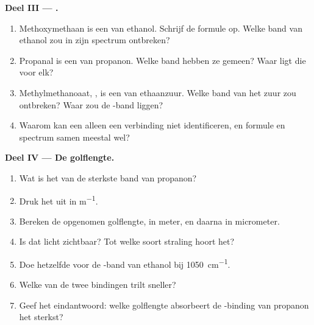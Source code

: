 \begin{problem}
\medskip
\noindent\textbf{Deel III --- .}
\begin{enumerate}[resume]
  \item Methoxymethaan is een  van ethanol. Schrijf de formule op.
        Welke band van ethanol zou in zijn spectrum ontbreken?
  \item Propanal is een  van propanon. Welke band hebben ze gemeen?
        Waar ligt die voor elk?
  \item Methylmethanoaat, , is een  van ethaanzuur.
        Welke band van het zuur zou ontbreken? Waar zou de
        -band liggen?
  \item Waarom kan een  alleen een verbinding niet
        identificeren, en formule en spectrum samen meestal wel?
\end{enumerate}

\medskip
\noindent\textbf{Deel IV --- De golflengte.}
\begin{enumerate}[resume]
  \item Wat is het  van de sterkste band van propanon?
  \item Druk het uit in \si{m^{-1}}.
  \item Bereken de opgenomen golflengte, in meter, en daarna in
        micrometer.
  \item Is dat licht zichtbaar? Tot welke soort straling hoort het?
  \item Doe hetzelfde voor de -band van ethanol bij
        \qty{1050}{cm^{-1}}.
  \item Welke van de twee bindingen trilt sneller?
  \item Geef het eindantwoord: welke golflengte absorbeert de
        -binding van propanon het sterkst?
\end{enumerate}
\end{problem}
